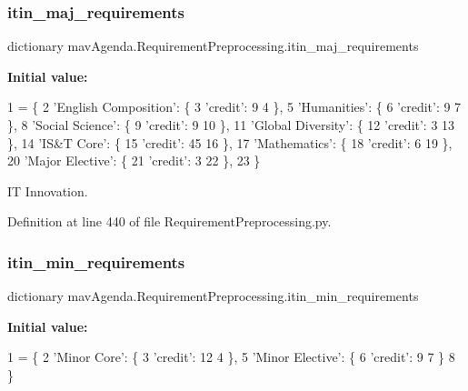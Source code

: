 \subsubsection{\texorpdfstring{itin\+\_\+maj\+\_\+requirements}{itin\_maj\_requirements}}
{\footnotesize\ttfamily dictionary mav\+Agenda.\+Requirement\+Preprocessing.\+itin\+\_\+maj\+\_\+requirements}

{\bfseries Initial value\+:}
\begin{DoxyCode}
1 =  \{
2     \textcolor{stringliteral}{'English Composition'}: \{
3         \textcolor{stringliteral}{'credit'}: 9
4     \},
5     \textcolor{stringliteral}{'Humanities'}: \{
6         \textcolor{stringliteral}{'credit'}: 9
7     \},
8     \textcolor{stringliteral}{'Social Science'}: \{
9         \textcolor{stringliteral}{'credit'}: 9
10     \},
11     \textcolor{stringliteral}{'Global Diversity'}: \{
12         \textcolor{stringliteral}{'credit'}: 3
13     \},
14     \textcolor{stringliteral}{'IS&T Core'}: \{
15         \textcolor{stringliteral}{'credit'}: 45
16     \},
17     \textcolor{stringliteral}{'Mathematics'}: \{
18         \textcolor{stringliteral}{'credit'}: 6
19     \},
20     \textcolor{stringliteral}{'Major Elective'}: \{
21         \textcolor{stringliteral}{'credit'}: 3
22     \},
23 \}
\end{DoxyCode}


IT Innovation. 



Definition at line 440 of file Requirement\+Preprocessing.\+py.

\mbox{\label{namespacemavAgenda_1_1RequirementPreprocessing_a0b1ac9c2ba9386bff64a0f3ef032cfeb}} 
\subsubsection{\texorpdfstring{itin\+\_\+min\+\_\+requirements}{itin\_min\_requirements}}
{\footnotesize\ttfamily dictionary mav\+Agenda.\+Requirement\+Preprocessing.\+itin\+\_\+min\+\_\+requirements}

{\bfseries Initial value\+:}
\begin{DoxyCode}
1 =  \{
2     \textcolor{stringliteral}{'Minor Core'}: \{
3         \textcolor{stringliteral}{'credit'}: 12
4     \},
5     \textcolor{stringliteral}{'Minor Elective'}: \{
6         \textcolor{stringliteral}{'credit'}: 9
7     \}
8 \}
\end{DoxyCode}


